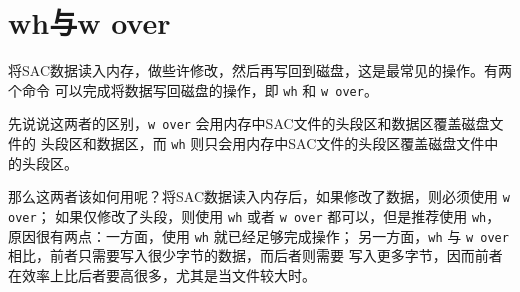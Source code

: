 \section{wh与w over}
将SAC数据读入内存，做些许修改，然后再写回到磁盘，这是最常见的操作。有两个命令
可以完成将数据写回磁盘的操作，即 \texttt{wh} 和 \texttt{w over}。

先说说这两者的区别，\texttt{w over} 会用内存中SAC文件的头段区和数据区覆盖磁盘文件的
头段区和数据区，而 \texttt{wh} 则只会用内存中SAC文件的头段区覆盖磁盘文件中的头段区。

那么这两者该如何用呢？将SAC数据读入内存后，如果修改了数据，则必须使用 \texttt{w over}；
如果仅修改了头段，则使用 \texttt{wh} 或者 \texttt{w over} 都可以，但是推荐使用 \texttt{wh}，
原因很有两点：一方面，使用 \texttt{wh} 就已经足够完成操作；
另一方面，\texttt{wh} 与 \texttt{w over} 相比，前者只需要写入很少字节的数据，而后者则需要
写入更多字节，因而前者在效率上比后者要高很多，尤其是当文件较大时。